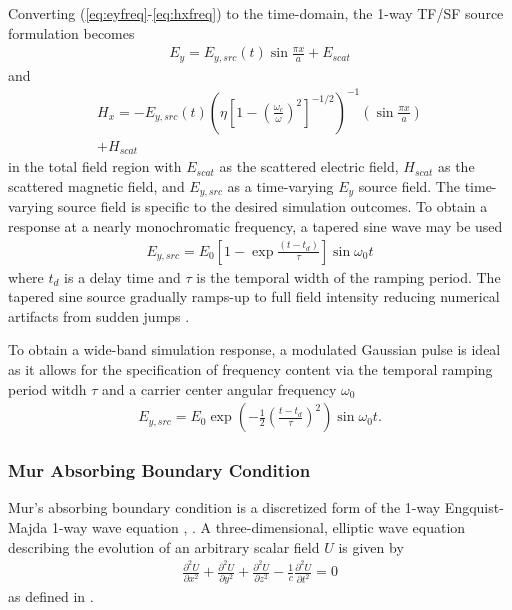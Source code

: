 Converting  (\ref{eq:eyfreq}-\ref{eq:hxfreq}) to the time-domain, the 1-way TF/SF source formulation becomes
\begin{align}
	E_y=E_{y,src}(t)\sin{\frac{\pi x}{a}} + E_{scat}
	\label{eq:tfsf-ey}
\end{align}
and
\begin{multline}
	H_x = -E_{y,src}(t)\left(\eta\left[1-\left(\frac{\omega_c}{\omega}\right)^2\right]^{-1/2}\right)^{-1}\left(\sin{\frac{\pi x}{a}}\right) \\ + H_{scat}
	\label{eq:tfsf-hx}
\end{multline}
in the total field region with $E_{scat}$ as the scattered electric field, $H_{scat}$ as the scattered magnetic field, and $E_{y,src}$ as a time-varying $E_y$ source field. The time-varying source field is specific to the desired simulation outcomes. To obtain a response at a nearly monochromatic frequency, a tapered sine wave may be used 
\begin{align}
	E_{y,src} = E_0\left[1 - \exp{\frac{(t - t_d)}{\tau}}\right]\sin{\omega_0 t}
\end{align}
where $t_d$ is a delay time and $\tau$ is the temporal width of the ramping period. The tapered sine source gradually ramps-up to full field intensity reducing numerical artifacts from sudden jumps \cite{rothlecnotes}.

To obtain a wide-band simulation response, a modulated Gaussian pulse is ideal as it allows for the specification of frequency content via the temporal ramping period witdh $\tau$ and a carrier center angular frequency $\omega_0$ \cite{rothlecnotes}  
\begin{align}
	E_{y,src} = E_0\exp{\left(-\frac{1}{2}\left(\frac{t-t_d}{\tau}\right)^2\right)}\sin{\omega_0t}.
\end{align}

\subsubsection{Mur Absorbing Boundary Condition}
\label{subsubsec:murtheory}
Mur's absorbing boundary condition is a discretized form of the 1-way Engquist-Majda 1-way wave equation \cite{taftlovefdtd}, \cite{rothlecnotes}. A three-dimensional, elliptic wave equation describing the evolution of an arbitrary scalar field $U$ is given by
\begin{align}
	\frac{\partial^2 U}{\partial x^2}+\frac{\partial^2 U}{\partial y^2}+\frac{\partial^2 U}{\partial z^2}-\frac{1}{c}\frac{\partial^2 U}{\partial t^2}=0
	\label{eq:scalarelliptic}
\end{align}
as defined in \cite{taftlovefdtd}.

